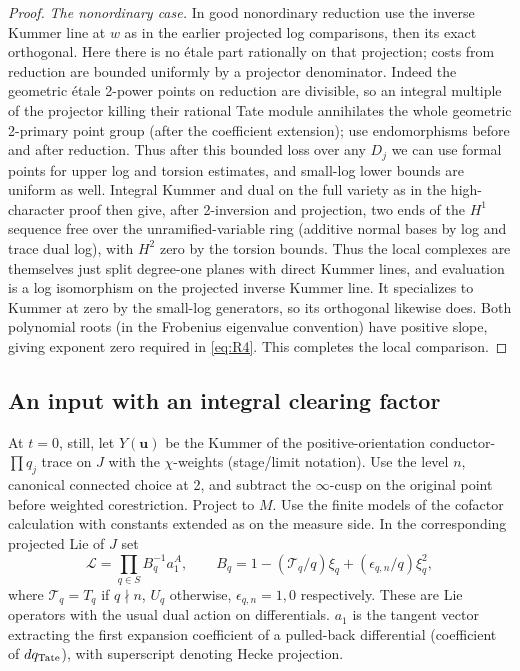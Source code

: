 \begin{proof}
\emph{The nonordinary case.}
In good nonordinary reduction use the inverse Kummer line at \(w\) as in the earlier projected log comparisons, then its exact orthogonal. Here there is no étale part rationally on that projection; costs from reduction are bounded uniformly by a projector denominator. Indeed the geometric étale 2-power points on reduction are divisible, so an integral multiple of the projector killing their rational Tate module annihilates the whole geometric 2-primary point group (after the coefficient extension); use endomorphisms before and after reduction. Thus after this bounded loss over any \(D_j\) we can use formal points for upper log and torsion estimates, and small-log lower bounds are uniform as well. Integral Kummer and dual on the full variety as in the high-character proof then give, after 2-inversion and projection, two ends of the \(H^1\) sequence free over the unramified-variable ring (additive normal bases by log and trace dual log), with \(H^2\) zero by the torsion bounds. Thus the local complexes are themselves just split degree-one planes with direct Kummer lines, and evaluation is a log isomorphism on the projected inverse Kummer line. It specializes to Kummer at zero by the small-log generators, so its orthogonal likewise does. Both polynomial roots (in the Frobenius eigenvalue convention) have positive slope, giving exponent zero required in \eqref{eq:R4}. This completes the local comparison.
\end{proof}

\subsection{An input with an integral clearing factor}

At \(t=0\), still, let \(Y(\mathbf u)\) be the Kummer of the positive-orientation conductor-\(\prod q_j\) trace on \(J\) with the \(\chi\)-weights (stage/limit notation). Use the level \(n\), canonical connected choice at 2, and subtract the \(\infty\)-cusp on the original point before weighted corestriction. Project to \(M\). Use the finite models of the cofactor calculation with constants extended as on the measure side. In the corresponding projected Lie of \(J\) set
\[
 \mathcal L=\prod_{q\in S} B_q^{-1} a_1^A,\qquad
 B_q=1-(\mathcal T_q/q)\xi_q+(\epsilon_{q,n}/q)\xi_q^2 ,
\]
where \(\mathcal T_q=T_q\) if \(q\nmid n\), \(U_q\) otherwise, \(\epsilon_{q,n}=1,0\) respectively. These are Lie operators with the usual dual action on differentials. \(a_1\) is the tangent vector extracting the first expansion coefficient of a pulled-back differential (coefficient of \(dq_{\rm Tate}\)), with superscript denoting Hecke projection.

